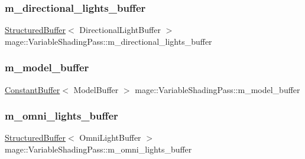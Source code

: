 \subsubsection{\texorpdfstring{m\+\_\+directional\+\_\+lights\+\_\+buffer}{m\_directional\_lights\_buffer}}
{\footnotesize\ttfamily \hyperlink{structmage_1_1_structured_buffer}{Structured\+Buffer}$<$ Directional\+Light\+Buffer $>$ mage\+::\+Variable\+Shading\+Pass\+::m\+\_\+directional\+\_\+lights\+\_\+buffer\hspace{0.3cm}{\ttfamily [private]}}

\hypertarget{classmage_1_1_variable_shading_pass_ab83602f0ffa6c0a3519ffaa467ae113a}{}\label{classmage_1_1_variable_shading_pass_ab83602f0ffa6c0a3519ffaa467ae113a} 
\subsubsection{\texorpdfstring{m\+\_\+model\+\_\+buffer}{m\_model\_buffer}}
{\footnotesize\ttfamily \hyperlink{structmage_1_1_constant_buffer}{Constant\+Buffer}$<$ Model\+Buffer $>$ mage\+::\+Variable\+Shading\+Pass\+::m\+\_\+model\+\_\+buffer\hspace{0.3cm}{\ttfamily [private]}}

\hypertarget{classmage_1_1_variable_shading_pass_a143a6926802a7559db9feeb288ea7488}{}\label{classmage_1_1_variable_shading_pass_a143a6926802a7559db9feeb288ea7488} 
\subsubsection{\texorpdfstring{m\+\_\+omni\+\_\+lights\+\_\+buffer}{m\_omni\_lights\_buffer}}
{\footnotesize\ttfamily \hyperlink{structmage_1_1_structured_buffer}{Structured\+Buffer}$<$ Omni\+Light\+Buffer $>$ mage\+::\+Variable\+Shading\+Pass\+::m\+\_\+omni\+\_\+lights\+\_\+buffer\hspace{0.3cm}{\ttfamily [private]}}

\hypertarget{classmage_1_1_variable_shading_pass_aacd5b6b967a0fcfe7510e289c3d630a0}{}\label{classmage_1_1_variable_shading_pass_aacd5b6b967a0fcfe7510e289c3d630a0} 
